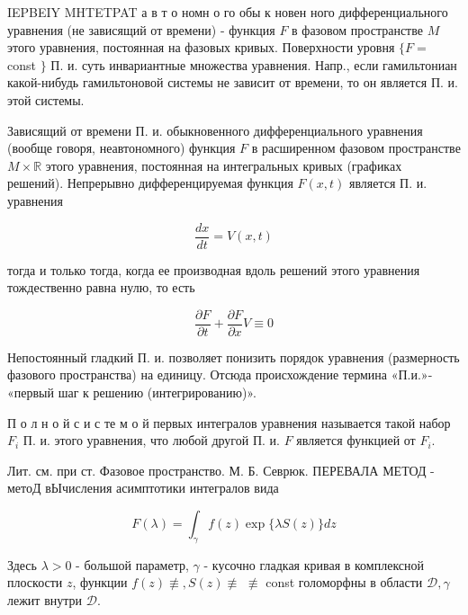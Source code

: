 \documentclass[10pt]{article}
\begin{document}
IEPBEIY MHTETPAT а в т о номн о го обы к новен ного дифференциального уравнения (не зависящий от времени) - функция $F$ в фазовом пространстве $M$ этого уравнения, постоянная на фазовых кривых. Поверхности уровня $\{F=$ const $\}$ П. и. суть инвариантные множества уравнения. Напр., если гамильтониан какой-нибудь гамильтоновой системы не зависит от времени, то он является П. и. этой системы.



Зависящий от времени П. и. обыкновенного дифференциального уравнения (вообще говоря, неавтономного) функция $F$ в расширенном фазовом пространстве $M \times \mathbb{R}$ этого уравнения, постоянная на интегральных кривых (графиках решений). Непрерывно дифференцируемая функция $F(x, t)$ является П. и. уравнения



\[

\frac{d x}{d t}=V(x, t)

\]



тогда и только тогда, когда ее производная вдоль решений этого уравнения тождественно равна нулю, то есть



\[

\frac{\partial F}{\partial t}+\frac{\partial F}{\partial x} V \equiv 0

\]



Непостоянный гладкий П. и. позволяет понизить порядок уравнения (размерность фазового пространства) на единицу. Отсюда происхождение термина «П.и.»- «первый шаг к решению (интегрированию)».



П о л н о й с и с те м о й первых интегралов уравнения называется такой набор $F_{i}$ П. и. этого уравнения, что любой другой П. и. $F$ является функцией от $F_{i}$.



Лит. см. при ст. Фазовое пространство. М. Б. Севрюк. ПЕРЕВАЛА МЕТОД - метоД вЫчисления асимптотики интегралов вида



\[

F(\lambda)=\int_{\gamma} f(z) \exp \{\lambda S(z)\} d z

\]



Здесь $\lambda>0$ - большой параметр, $\gamma$ - кусочно гладкая кривая в комплексной плоскости $z$, функции $f(z) \not \equiv, S(z) \not \equiv$ $\not \equiv$ const голоморфны в области $\mathscr{D}, \gamma$ лежит внутри $\mathscr{D}$.
\end{document}
